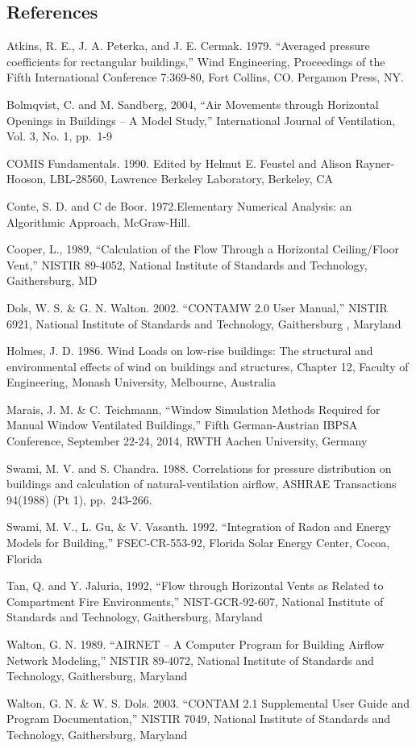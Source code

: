 \subsection{References}\label{references-004}

Atkins, R. E., J. A. Peterka, and J. E. Cermak. 1979. ``Averaged pressure coefficients for rectangular buildings,'' Wind Engineering, Proceedings of the Fifth International Conference 7:369-80, Fort Collins, CO. Pergamon Press, NY.

Bolmqvist, C. and M. Sandberg, 2004, ``Air Movements through Horizontal Openings in Buildings -- A Model Study,'' International Journal of Ventilation, Vol. 3, No. 1, pp.~1-9

COMIS Fundamentals. 1990. Edited by Helmut E. Feustel and Alison Rayner-Hooson, LBL-28560, Lawrence Berkeley Laboratory, Berkeley, CA

Conte, S. D. and C de Boor. 1972.Elementary Numerical Analysis: an Algorithmic Approach, McGraw-Hill.

Cooper, L., 1989, ``Calculation of the Flow Through a Horizontal Ceiling/Floor Vent,'' NISTIR 89-4052, National Institute of Standards and Technology, Gaithersburg, MD

Dols, W. S. \& G. N. Walton. 2002. ``CONTAMW 2.0 User Manual,'' NISTIR 6921, National Institute of Standards and Technology, Gaithersburg , Maryland

Holmes, J. D. 1986. Wind Loads on low-rise buildings: The structural and environmental effects of wind on buildings and structures, Chapter 12, Faculty of Engineering, Monash University, Melbourne, Australia

Marais, J. M. \& C. Teichmann, ``Window Simulation Methods Required for Manual Window Ventilated Buildings,'' Fifth German-Austrian IBPSA Conference, September 22-24, 2014, RWTH Aachen University, Germany

Swami, M. V. and S. Chandra. 1988. Correlations for pressure distribution on buildings and calculation of natural-ventilation airflow, ASHRAE Transactions 94(1988) (Pt 1), pp.~243-266.

Swami, M. V., L. Gu, \& V. Vasanth. 1992. ``Integration of Radon and Energy Models for Building,'' FSEC-CR-553-92, Florida Solar Energy Center, Cocoa, Florida

Tan, Q. and Y. Jaluria, 1992, ``Flow through Horizontal Vents as Related to Compartment Fire Environments,'' NIST-GCR-92-607, National Institute of Standards and Technology, Gaithersburg, Maryland

Walton, G. N. 1989. ``AIRNET -- A Computer Program for Building Airflow Network Modeling,'' NISTIR 89-4072, National Institute of Standards and Technology, Gaithersburg, Maryland

Walton, G. N. \& W. S. Dols. 2003. ``CONTAM 2.1 Supplemental User Guide and Program Documentation,'' NISTIR 7049, National Institute of Standards and Technology, Gaithersburg, Maryland
